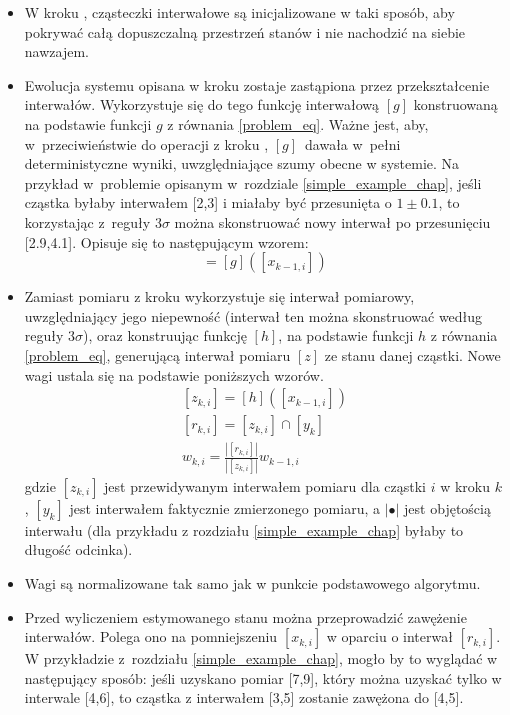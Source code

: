 \begin{itemize}
	\item W kroku , cząsteczki interwałowe są inicjalizowane w taki sposób, aby pokrywać całą dopuszczalną przestrzeń stanów i nie nachodzić na siebie nawzajem.
	\item Ewolucja systemu opisana w kroku  zostaje zastąpiona przez przekształcenie interwałów. Wykorzystuje się do tego funkcję interwałową $[g]$ konstruowaną na podstawie funkcji $g$ z równania \ref{problem_eq}. Ważne jest, aby, w~przeciwieństwie do operacji z kroku , $[g]$~dawała w~pełni deterministyczne wyniki, uwzględniające szumy obecne w systemie. Na przykład w~problemie opisanym w~rozdziale \ref{simple_example_chap}, jeśli cząstka byłaby interwałem [2,3] i miałaby być przesunięta o $1\pm 0.1$, to korzystając z~reguły $3\sigma$ \cite{3_sigma_rule} można skonstruować nowy interwał po przesunięciu [2.9,4.1]. Opisuje się to następującym wzorem:
	\begin{equation}
		[x_{k,i}] = [g]([x_{k-1,i}])
	\end{equation}
	
	\item Zamiast pomiaru z kroku  wykorzystuje się interwał pomiarowy, uwzględniający jego niepewność (interwał ten można skonstruować według reguły $3\sigma$), oraz konstruując funkcję $[h]$, na podstawie funkcji $h$ z równania \ref{problem_eq}, generującą interwał pomiaru $[z]$ ze stanu danej cząstki. Nowe wagi ustala się na podstawie poniższych wzorów.
	\begin{equation}
		\begin{aligned}
			[z_{k,i}] = [h]([x_{k-1,i}])\\
			[r_{k,i}] = [z_{k,i}] \cap [y_{k}]\\
			w_{k,i} = \frac{|[r_{k,i}]|}{|[z_{k,i}]|} w_{k-1,i}
		\end{aligned}
	\end{equation}
	gdzie $[z_{k,i}]$ jest przewidywanym interwałem pomiaru dla cząstki $i$ w kroku $k$, $[y_{k}]$ jest interwałem faktycznie zmierzonego pomiaru, a $|\bullet|$ jest objętością interwału (dla przykładu z rozdziału \ref{simple_example_chap} byłaby to długość odcinka).
	\item Wagi są normalizowane tak samo jak w punkcie  podstawowego algorytmu.
	
	\item Przed wyliczeniem estymowanego stanu można przeprowadzić zawężenie interwałów. Polega ono na pomniejszeniu $[x_{k,i}]$ w oparciu o interwał $[r_{k,i}]$. W przykładzie z~rozdziału \ref{simple_example_chap}, mogło by to wyglądać w następujący sposób: jeśli uzyskano pomiar [7,9], który można uzyskać tylko w interwale [4,6], to cząstka z interwałem [3,5] zostanie zawężona do [4,5].
	

\end{itemize}
